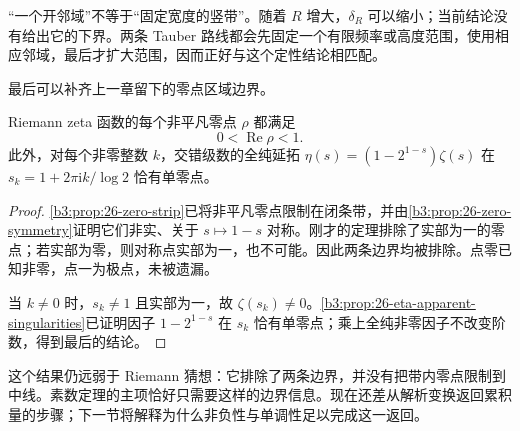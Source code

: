 “一个开邻域”不等于“固定宽度的竖带”。随着 \(R\) 增大，\(\delta_R\) 可以缩小；当前结论没有给出它的下界。两条 Tauber 路线都会先固定一个有限频率或高度范围，使用相应邻域，最后才扩大范围，因而正好与这个定性结论相匹配。

最后可以补齐上一章留下的零点区域边界。
\begin{corollary}[非平凡零点位于开临界带]\label{b3:cor:27-open-critical-strip}
Riemann zeta 函数的每个非平凡零点 \(\rho\) 都满足
\[
 0<\operatorname{Re}\rho<1.
\]
此外，对每个非零整数 \(k\)，交错级数的全纯延拓
\(\eta(s)=(1-2^{1-s})\zeta(s)\) 在
\(s_k=1+2\pi\mathrm ik/\log2\) 恰有单零点。
\end{corollary}
\begin{proof}
\cref{b3:prop:26-zero-strip}已将非平凡零点限制在闭条带，并由\cref{b3:prop:26-zero-symmetry}证明它们非实、关于 \(s\mapsto1-s\) 对称。刚才的定理排除了实部为一的零点；若实部为零，则对称点实部为一，也不可能。因此两条边界均被排除。点零已知非零，点一为极点，未被遗漏。

当 \(k\ne0\) 时，\(s_k\ne1\) 且实部为一，故 \(\zeta(s_k)\ne0\)。\cref{b3:prop:26-eta-apparent-singularities}已证明因子 \(1-2^{1-s}\) 在 \(s_k\) 恰有单零点；乘上全纯非零因子不改变阶数，得到最后的结论。
\end{proof}

这个结果仍远弱于 Riemann 猜想：它排除了两条边界，并没有把带内零点限制到中线。素数定理的主项恰好只需要这样的边界信息。现在还差从解析变换返回累积量的步骤；下一节将解释为什么非负性与单调性足以完成这一返回。
